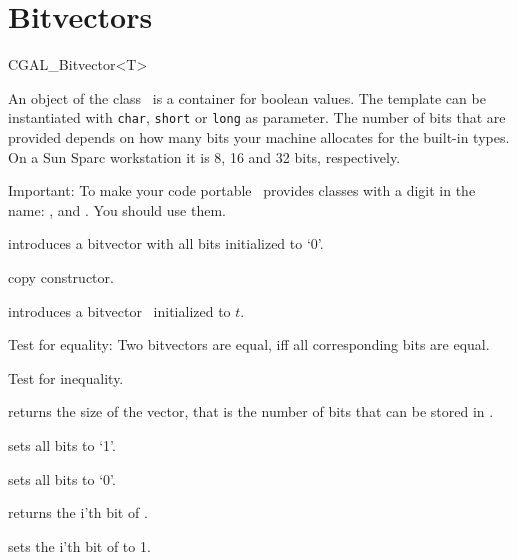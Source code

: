 
\cleardoublepage
\chapter{Bitvectors\label{Bitvectors}}

\begin {classtemplate} {CGAL_Bitvector<T>}

An object of the class \classname\ is a container for boolean values.
The template can be instantiated with {\tt char}, {\tt short} or {\tt long}
as parameter. The number of bits that are provided depends on how many
bits your machine allocates for the built-in types. On a {\sc Sun} 
Sparc workstation it is 8, 16 and 32 bits, respectively. 

Important: To make your code portable \cgal\ provides classes with a digit
in the name: ,  and
. You should use them. 


\creation
{}

             {introduces a bitvector with all  bits initialized to `0'.}

\hidden {}
 	    {copy constructor.}

            {introduces a bitvector \var\ initialized to $t$.}


\operations
\threecolumns{5cm}{4cm}

       {Test for equality: Two bitvectors are equal, iff all corresponding 
        bits are equal.}

       {Test for inequality.}

        {returns the size of the vector, that is the number of bits that 
         can be stored in \var.}

  
       {sets all bits to `1'.}

       {sets all bits to `0'.}

       {returns the i'th bit of \var.}

       {sets the i'th bit of \var to 1.}


\end{classtemplate}
